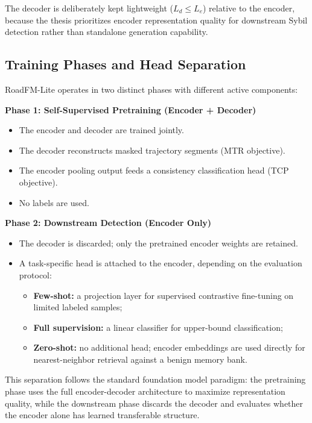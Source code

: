 \documentclass[12pt]{article}
\begin{document}
The decoder is deliberately kept lightweight ($L_d \leq L_e$) relative to the encoder, because the thesis prioritizes encoder representation quality for downstream Sybil detection rather than standalone generation capability.

\subsection{Training Phases and Head Separation}\label{subsec:phases}

RoadFM-Lite operates in two distinct phases with different active components:

\textbf{Phase 1: Self-Supervised Pretraining (Encoder + Decoder)}\par\vspace{0.2\baselineskip}
\begin{itemize}
    \item The encoder and decoder are trained jointly.
    \item The decoder reconstructs masked trajectory segments (MTR objective).
    \item The encoder pooling output feeds a consistency classification head (TCP objective).
    \item No labels are used.
\end{itemize}

\textbf{Phase 2: Downstream Detection (Encoder Only)}\par\vspace{0.2\baselineskip}
\begin{itemize}
    \item The decoder is discarded; only the pretrained encoder weights are retained.
    \item A task-specific head is attached to the encoder, depending on the evaluation protocol:
    \begin{itemize}
        \item \textbf{Few-shot:} a projection layer for supervised contrastive fine-tuning on limited labeled samples;
        \item \textbf{Full supervision:} a linear classifier for upper-bound classification;
        \item \textbf{Zero-shot:} no additional head; encoder embeddings are used directly for nearest-neighbor retrieval against a benign memory bank.
    \end{itemize}
\end{itemize}

This separation follows the standard foundation model paradigm: the pretraining phase uses the full encoder-decoder architecture to maximize representation quality, while the downstream phase discards the decoder and evaluates whether the encoder alone has learned transferable structure.
\end{document}
